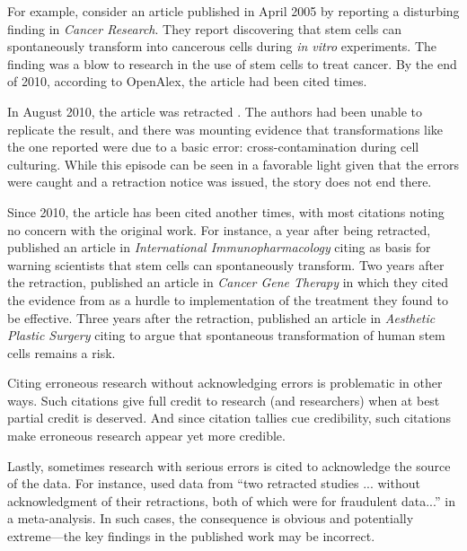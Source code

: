 \documentclass[11pt,letterpaper]{article}
\begin{document}
For example, consider an article published in April 2005 by \citet{rubio2005spontaneous} reporting a disturbing finding in \textit{Cancer Research}. They report discovering that stem cells can spontaneously transform into cancerous cells during \textit{in vitro} experiments. The finding was a blow to research in the use of stem cells to treat cancer. By the end of 2010, according to OpenAlex, the article had been cited \ExampleThroughRetraction{} times.

In August 2010, the article was retracted \citep{de2010retraction}. The authors had been unable to replicate the result, and there was mounting evidence that transformations like the one reported were due to a basic error: cross-contamination during cell culturing. While this episode can be seen in a favorable light given that the errors were caught and a retraction notice was issued, the story does not end there.

Since 2010, the article has been cited another \ExampleAfterRetraction{} times, with most citations noting no concern with the original work. For instance, a year after being retracted, \citet{firinci2011mesenchymal} published an article in \textit{International Immunopharmacology} citing \citeauthor{rubio2005spontaneous} as basis for warning scientists that stem cells can spontaneously transform. Two years after the retraction, \citet{kosaka2012therapeutic} published an article in \textit{Cancer Gene Therapy} in which they cited the evidence from \citeauthor{rubio2005spontaneous} as a hurdle to implementation of the treatment they found to be effective. Three years after the retraction, \citet{chang2013safety} published an article in \textit{Aesthetic Plastic Surgery} citing \citeauthor{rubio2005spontaneous} to argue that spontaneous transformation of human stem cells remains a risk.

Citing erroneous research without acknowledging errors is problematic in other ways. Such citations give full credit to research (and researchers) when at best partial credit is deserved. And since citation tallies cue credibility, such citations make erroneous research appear yet more credible.

Lastly, sometimes research with serious errors is cited to acknowledge the source of the data. For instance, \citet{lin2013perioperative} used data from ``two retracted studies ... without acknowledgment of their retractions, both of which were for fraudulent data...'' \citep[p. 718,][]{yi2015comment} in a meta-analysis. In such cases, the consequence is obvious and potentially extreme---the key findings in the published work may be incorrect.
\end{document}
